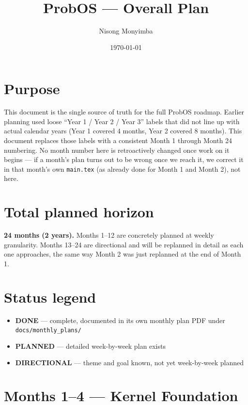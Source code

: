 \documentclass[11pt]{article}
\title{ProbOS --- Overall Plan}
\author{Nisong Monyimba}
\date{\today}
\begin{document}
\maketitle

\section*{Purpose}
This document is the single source of truth for the full ProbOS roadmap.
Earlier planning used loose ``Year 1 / Year 2 / Year 3'' labels that did
not line up with actual calendar years (Year 1 covered 4 months, Year 2
covered 8 months). This document replaces those labels with a
consistent Month 1 through Month 24 numbering. No month number here is
retroactively changed once work on it begins --- if a month's plan turns
out to be wrong once we reach it, we correct it in that month's own
\texttt{main.tex} (as already done for Month 1 and Month 2), not here.

\section*{Total planned horizon}
\textbf{24 months (2 years).} Months 1--12 are concretely planned at
weekly granularity. Months 13--24 are directional and will be replanned
in detail as each one approaches, the same way Month 2 was just
replanned at the end of Month 1.

\section*{Status legend}
\begin{itemize}[leftmargin=*]
  \item \textbf{DONE} --- complete, documented in its own monthly plan
    PDF under \texttt{docs/monthly\_plans/}
  \item \textbf{PLANNED} --- detailed week-by-week plan exists
  \item \textbf{DIRECTIONAL} --- theme and goal known, not yet
    week-by-week planned
\end{itemize}

\section*{Months 1--4 --- Kernel Foundation}
\end{document}
